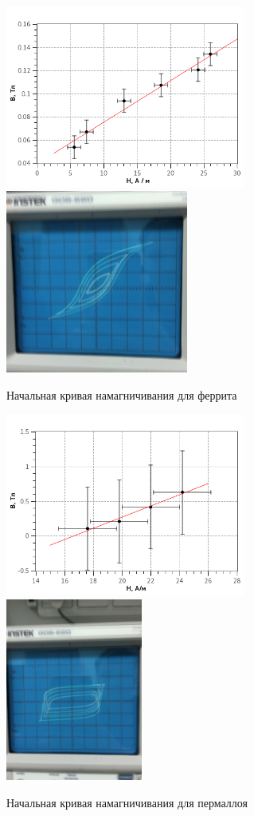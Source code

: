 \documentclass{article}
\begin{document}
   \begin{figure}[h]
   \centering
   \includegraphics[height=6cm]{plot1.png} 
   \includegraphics[height=6cm]{fig2.jpg}   
   \caption{Начальная кривая намагничивания для феррита} 
   \label{fig.2} 
   \end{figure}
       
   \begin{figure}[h]
   \centering
   \includegraphics[height=6cm]{plot2.png} 
   \includegraphics[height=6cm]{fig3.jpg}  
   \caption{Начальная кривая намагничивания для пермаллоя} 
   \label{fig.3} 
   \end{figure}
\end{document}
